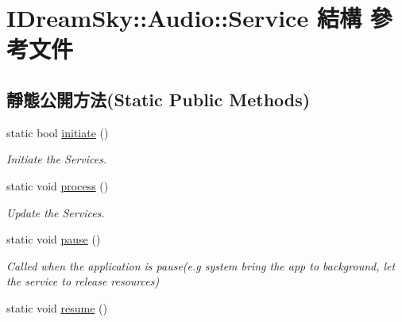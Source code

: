 \hypertarget{struct_i_dream_sky_1_1_audio_1_1_service}{}\section{I\+Dream\+Sky\+:\+:Audio\+:\+:Service 結構 參考文件}
\label{struct_i_dream_sky_1_1_audio_1_1_service}
\subsection*{靜態公開方法(Static Public Methods)}
\begin{DoxyCompactItemize}
\item 
static bool \hyperlink{struct_i_dream_sky_1_1_audio_1_1_service_a6ce71d0150696798d7b888c69658e926}{initiate} ()
\begin{DoxyCompactList}\small\item\em Initiate the Services. \end{DoxyCompactList}\item 
static void \hyperlink{struct_i_dream_sky_1_1_audio_1_1_service_a7e5b7e49e62d6efe5e09526ae0df3050}{process} ()\hypertarget{struct_i_dream_sky_1_1_audio_1_1_service_a7e5b7e49e62d6efe5e09526ae0df3050}{}\label{struct_i_dream_sky_1_1_audio_1_1_service_a7e5b7e49e62d6efe5e09526ae0df3050}

\begin{DoxyCompactList}\small\item\em Update the Services. \end{DoxyCompactList}\item 
static void \hyperlink{struct_i_dream_sky_1_1_audio_1_1_service_a24e8ff3eac10eb7e3a59f6d2820f8b6a}{pause} ()\hypertarget{struct_i_dream_sky_1_1_audio_1_1_service_a24e8ff3eac10eb7e3a59f6d2820f8b6a}{}\label{struct_i_dream_sky_1_1_audio_1_1_service_a24e8ff3eac10eb7e3a59f6d2820f8b6a}

\begin{DoxyCompactList}\small\item\em Called when the application is pause(e.\+g system bring the app to background, let the service to release resources) \end{DoxyCompactList}\item 
static void \hyperlink{struct_i_dream_sky_1_1_audio_1_1_service_a04dc8b589057ee292ebc57b5d488b3aa}{resume} ()\hypertarget{struct_i_dream_sky_1_1_audio_1_1_service_a04dc8b589057ee292ebc57b5d488b3aa}{}\label{struct_i_dream_sky_1_1_audio_1_1_service_a04dc8b589057ee292ebc57b5d488b3aa}


\end{DoxyCompactItemize}
